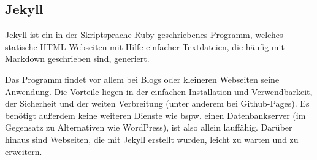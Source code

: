 \subsection{Jekyll}

Jekyll ist ein in der Skriptsprache Ruby geschriebenes Programm, welches
statische HTML-Webseiten mit Hilfe einfacher Textdateien, die häufig
mit Markdown geschrieben sind, generiert. 

Das Programm findet vor allem bei Blogs oder kleineren 
Webseiten seine Anwendung. Die Vorteile liegen in der einfachen Installation und
Verwendbarkeit, der Sicherheit und der weiten Verbreitung (unter anderem bei 
Github-Pages). Es benötigt außerdem keine weiteren Dienste wie bspw. einen Datenbankserver 
(im Gegensatz zu Alternativen wie WordPress), ist also allein lauffähig.
Darüber hinaus sind Webseiten, die mit Jekyll erstellt wurden, leicht zu warten und
zu erweitern.\cite{jekyll} 